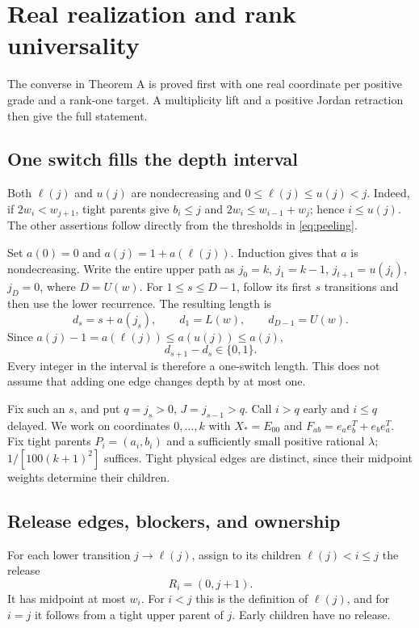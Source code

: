 \section{Real realization and rank universality}\label{sec:real}
The converse in Theorem A is proved first with one real coordinate per positive grade and a rank-one target. A multiplicity lift and a positive Jordan retraction then give the full statement.

\subsection{One switch fills the depth interval}
Both $\ell(j)$ and $u(j)$ are nondecreasing and $0\le\ell(j)\le u(j)<j$. Indeed, if $2w_i<w_{j+1}$, tight parents give $b_i\le j$ and
$2w_i\le w_{i-1}+w_j$; hence $i\le u(j)$. The other assertions follow directly from the thresholds in \eqref{eq:peeling}.

Set $a(0)=0$ and $a(j)=1+a(\ell(j))$. Induction gives that $a$ is nondecreasing. Write the entire upper path as $j_0=k$, $j_1=k-1$, $j_{t+1}=u(j_t)$, $j_D=0$, where $D=U(w)$. For $1\le s\le D-1$, follow its first $s$ transitions and then use the lower recurrence. The resulting length is
\[
 d_s=s+a(j_s),\qquad d_1=L(w),\qquad d_{D-1}=U(w).
\]
Since $a(j)-1=a(\ell(j))\le a(u(j))\le a(j)$,
\begin{equation}\label{eq:one-switch}
 d_{s+1}-d_s\in\{0,1\}.
\end{equation}
Every integer in the interval is therefore a one-switch length. This does not assume that adding one edge changes depth by at most one.

Fix such an $s$, and put $q=j_s>0$, $J=j_{s-1}>q$. Call $i>q$ early and $i\le q$ delayed. We work on coordinates $0,\ldots,k$ with $X_*=E_{00}$ and $F_{ab}=e_ae_b^T+e_be_a^T$. Fix tight parents $P_i=(a_i,b_i)$ and a sufficiently small positive rational $\lambda$; $1/[100(k+1)^2]$ suffices. Tight physical edges are distinct, since their midpoint weights determine their children.

\subsection{Release edges, blockers, and ownership}
For each lower transition $j\to\ell(j)$, assign to its children $\ell(j)<i\le j$ the release
\[
 R_i=(0,j+1).
\]
It has midpoint at most $w_i$. For $i<j$ this is the definition of $\ell(j)$, and for $i=j$ it follows from a tight upper parent of $j$. Early children have no release.

